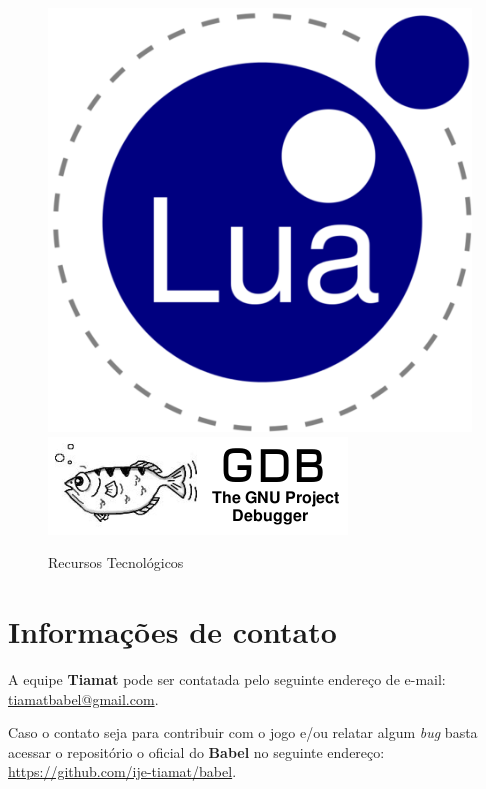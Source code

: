 \documentclass[11pt]{article} %
\begin{document}
\begin{figure}[!htp]
\begin{center}
  \includegraphics[scale=0.15]{res/lua.png} \quad
  \includegraphics[scale=0.4]{res/GDB.png} \quad
\caption{Recursos Tecnológicos} \label{gdimotes}
\end{center}
\end{figure}

\section*{Informações de contato}
A equipe \textbf{Tiamat} pode ser contatada pelo seguinte endereço de e-mail: \href{mailto:tiamatbabel@gmail.com}{tiamatbabel@gmail.com}.

Caso o contato seja para contribuir com o jogo e/ou relatar algum \textit{bug} basta acessar o repositório o oficial do \textbf{Babel} no seguinte endereço: \url{https://github.com/ije-tiamat/babel}.
\end{document}
